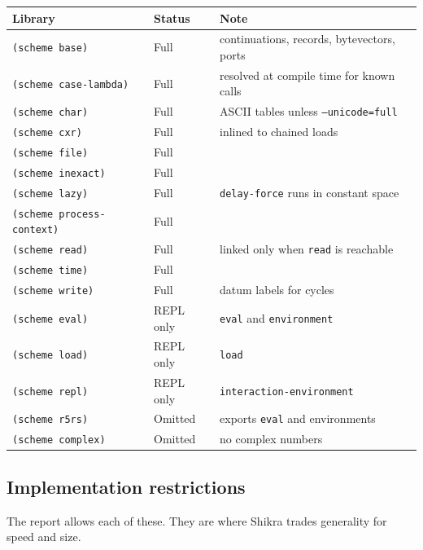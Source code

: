 \documentclass[a4paper,11pt]{article}
\begin{document}
\begin{center}
\begin{tabular}{lll}
\hline
Library & Status & Note \\
\hline
\texttt{(scheme base)} & Full & continuations, records, bytevectors, ports \\
\texttt{(scheme case-lambda)} & Full & resolved at compile time for known calls \\
\texttt{(scheme char)} & Full & ASCII tables unless \texttt{--unicode=full} \\
\texttt{(scheme cxr)} & Full & inlined to chained loads \\
\texttt{(scheme file)} & Full & \\
\texttt{(scheme inexact)} & Full & \\
\texttt{(scheme lazy)} & Full & \texttt{delay-force} runs in constant space \\
\texttt{(scheme process-context)} & Full & \\
\texttt{(scheme read)} & Full & linked only when \texttt{read} is reachable \\
\texttt{(scheme time)} & Full & \\
\texttt{(scheme write)} & Full & datum labels for cycles \\
\texttt{(scheme eval)} & REPL only & \texttt{eval} and \texttt{environment} \\
\texttt{(scheme load)} & REPL only & \texttt{load} \\
\texttt{(scheme repl)} & REPL only & \texttt{interaction-environment} \\
\texttt{(scheme r5rs)} & Omitted & exports \texttt{eval} and environments \\
\texttt{(scheme complex)} & Omitted & no complex numbers \\
\hline
\end{tabular}
\end{center}

\subsection{Implementation restrictions}

The report allows each of these. They are where Shikra trades generality for
speed and size.
\end{document}
